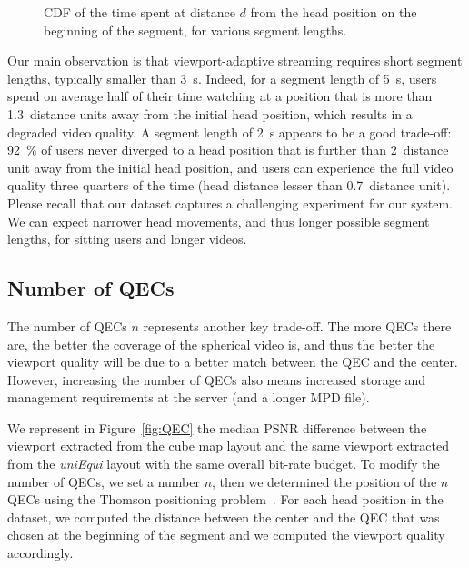 \begin{figure}
\centering

\caption{CDF of the time spent at distance $d$ from the head position on the beginning of the
segment, for various segment lengths.}\label{cdf-dataset}
\end{figure}

Our main observation is that viewport-adaptive streaming requires
short segment lengths, typically smaller than \SI{3}{\second}. Indeed,
for a segment length of \SI{5}{\second}, users spend on average half of
their time watching at a position that is more than
\num{1.3}~distance units away from the initial head position, which
results in a degraded video quality. A segment length of
\SI{2}{\second} appears to be a good trade-off: \SI{92}{\percent} of
users never diverged to a head position that is further than
\num{2}~distance unit away from the initial head position, and users
can experience the full video quality three quarters of the time (head distance
lesser than \num{0.7}~distance unit). Please recall that our dataset
captures a challenging experiment for our system. We can expect
narrower head movements, and thus longer possible segment lengths, for
sitting users and longer videos.


\subsection{Number of \acp{QEC}}

The number of \acp{QEC} $n$ represents another key trade-off. The more
\acp{QEC} there are, the better the coverage of the spherical video
is, and thus the better the viewport quality will be due to a better
match between the \ac{QEC} and the \FoV{} center. However,
increasing the number of \acp{QEC} also means increased storage and
management requirements at the server (and a longer \ac{MPD} file).


We represent in Figure~\ref{fig:QEC} the median \ac{PSNR} difference
between the viewport extracted from the cube map layout and the
same viewport extracted from the \emph{uniEqui} layout with the same
overall bit-rate budget. To modify the number of \acp{QEC}, we set a
number $n$, then we determined the position of the $n$ \acp{QEC}
using the Thomson positioning problem~\cite{rakhmanov1994electrons}.
For each head position in the dataset, we computed the distance
between the \FoV{} center and the \ac{QEC} that was chosen at the
beginning of the segment and we computed the viewport quality
accordingly.


